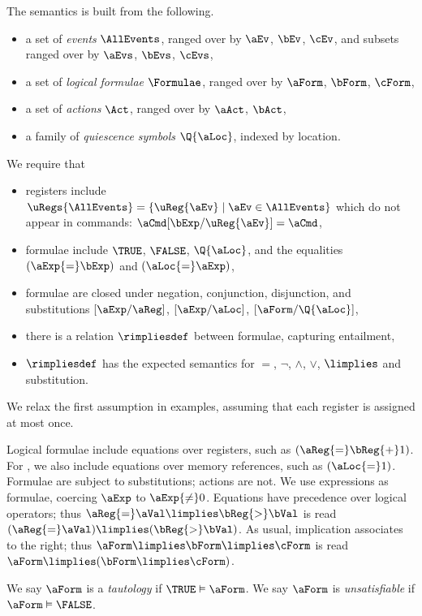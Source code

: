 The semantics is built from the following.
\begin{itemize}
\item a set of \emph{events} $\AllEvents$, ranged over by $\aEv$, $\bEv$,
  $\cEv$, %
  and subsets ranged over by $\aEvs$, $\bEvs$, $\cEvs$,  
\item a set of \emph{logical formulae} $\Formulae$, ranged over by $\aForm$,
  $\bForm$, $\cForm$,
\item a set of \emph{actions} $\Act$, ranged over by $\aAct$, $\bAct$, 
\item a family of \emph{quiescence symbols} $\Q{\aLoc}$, indexed by location.
\end{itemize}

We require that
\begin{itemize}
\item registers include %
  $\uRegs{\AllEvents}=\{\uReg{\aEv}\mid\aEv\in\AllEvents\}$ which do not appear in commands:
  $\aCmd[\bExp/\uReg{\aEv}]=\aCmd$,
\item formulae include $\TRUE$, $\FALSE$, $\Q{\aLoc}$, and the equalities $(\aExp{=}\bExp)$ and $(\aLoc{=}\aExp)$,
\item formulae are closed under negation, conjunction, disjunction, and
  substitutions $[\aExp/\aReg]$, $[\aExp/\aLoc]$, $[\aForm/\Q{\aLoc}]$,
\item there is a relation $\rimpliesdef$ between
  formulae, capturing entailment, 
\item $\rimpliesdef$ has the expected semantics for $=$, $\lnot$, $\land$, $\lor$,
  $\limplies$ and substitution.
\end{itemize}
We relax the first assumption in examples, assuming that each register is
assigned at most once.

Logical formulae include equations over registers, such as
$(\aReg{=}\bReg{+}1)$.  For \xLIR{}, we also include equations over memory
references, such as $(\aLoc{=}1)$.  Formulae are subject to substitutions;
actions are not.  We use expressions as formulae, coercing $\aExp$ to
$\aExp{\neq}0$.  Equations have precedence over logical operators; thus
$\aReg{=}\aVal\limplies\bReg{>}\bVal$ is read
$(\aReg{=}\aVal)\limplies(\bReg{>}\bVal)$.  As usual, implication associates
to the right; thus $\aForm\limplies\bForm\limplies\cForm$ is read
$\aForm\limplies(\bForm\limplies\cForm)$.

We say
$\aForm$ is a \emph{tautology} if $\TRUE\vDash\aForm$.
We say
$\aForm$ is \emph{unsatisfiable} if $\aForm\vDash\FALSE$.



